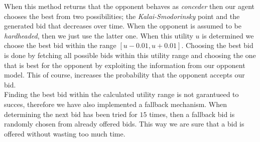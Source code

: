 When this method returns that the opponent behaves as \emph{conceder} then our agent chooses the best from two possibilities; the \emph{Kalai-Smodorinsky} point and the generated bid that decreases over time. When the opponent is assumed to be \emph{hardheaded}, then we just use the latter one. When this utility $u$ is determined we choose the best bid within the range $[u-0.01, u+0.01]$. Choosing the best bid is done by fetching all possible bids within this utility range and choosing the one that is best for the opponent by exploiting the information from our opponent model. This of course, increases the probability that the opponent accepts our bid. \\

Finding the best bid within the calculated utility range is not garantueed to succes, therefore we have also implemented a fallback mechanism. When determining the next bid has been tried for $15$ times, then a fallback bid is randomly chosen from already offered bids. This way we are sure that a bid is offered without wasting too much time.

